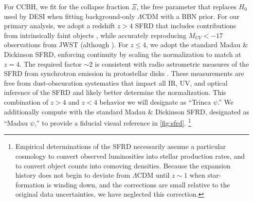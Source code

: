 \documentclass[a4paper,11pt]{article}
\begin{document}
For CCBH, we fit for the collapse fraction $\Xi$, the free parameter that replaces $H_0$ used by DESI when fitting background-only $\Lambda$CDM with a BBN prior.
For our primary analysis, we adopt a redshift $z > 4$ SFRD that includes contributions from intrinsically faint objects \cite[][Fig.~3]{Trinca2024}, while accurately reproducing $M_{UV} < -17$ observations from JWST \cite[e.g.][Fig.~8]{AdamsSFRD2024} (although \cite[c.f.][]{DSilva2023_AGNContamination, DSilva2023_GAMADEVILS}).
For $z \leqslant 4$, we adopt the standard Madau \& Dickinson \cite[][]{MadauDickinson2014, madaufragos2017} SFRD, enforcing continuity by scaling the normalization to match at $z=4$.
The required factor $\sim 2$ is consistent with radio astrometric measures of the SFRD from synchrotron emission in protostellar disks \cite{hopkinsbeacom2006}.
These measurements are free from dust-obscuration systematics that impact all IR, UV, and optical inference of the SFRD and likely better determine the normalization.
This combination of $z > 4$ and $z < 4$ behavior we will designate as ``Trinca $\psi$.''
We additionally compute with the standard Madau \& Dickinson SFRD, designated as ``Madau $\psi$,'' to provide a fiducial visual reference in \cref{fig:sfrd}.%
\footnote{Empirical determinations of the SFRD necessarily assume a particular cosmology to convert observed luminosities into stellar production rates, and to convert object counts into comoving densities.
Because the expansion history does not begin to deviate from $\Lambda$CDM until $z\sim 1$ when star-formation is winding down, and the corrections are small relative to the original data uncertainties, we have neglected this correction.}
\end{document}
